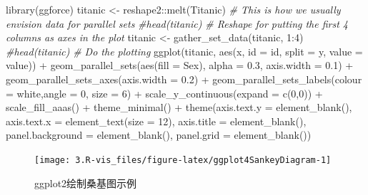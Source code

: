 \documentclass[
  10pt,
]{book}
\newenvironment{Shaded}{\begin{snugshade}}{\end{snugshade}}
\newcommand{\AttributeTok}[1]{\textcolor[rgb]{0.77,0.63,0.00}{#1}}
\newcommand{\CommentTok}[1]{\textcolor[rgb]{0.56,0.35,0.01}{\textit{#1}}}
\newcommand{\DecValTok}[1]{\textcolor[rgb]{0.00,0.00,0.81}{#1}}
\newcommand{\FloatTok}[1]{\textcolor[rgb]{0.00,0.00,0.81}{#1}}
\newcommand{\FunctionTok}[1]{\textcolor[rgb]{0.00,0.00,0.00}{#1}}
\newcommand{\NormalTok}[1]{#1}
\newcommand{\OtherTok}[1]{\textcolor[rgb]{0.56,0.35,0.01}{#1}}
\newcommand{\SpecialCharTok}[1]{\textcolor[rgb]{0.00,0.00,0.00}{#1}}
\newcommand{\StringTok}[1]{\textcolor[rgb]{0.31,0.60,0.02}{#1}}
\begin{document}
\begin{Shaded}
\begin{Highlighting}[]
\FunctionTok{library}\NormalTok{(ggforce)}
\NormalTok{titanic }\OtherTok{\textless{}{-}}\NormalTok{ reshape2}\SpecialCharTok{::}\FunctionTok{melt}\NormalTok{(Titanic)}
\CommentTok{\# This is how we usually envision data for parallel sets}
\CommentTok{\#head(titanic)}
\CommentTok{\# Reshape for putting the first 4 columns as axes in the plot}
\NormalTok{titanic }\OtherTok{\textless{}{-}} \FunctionTok{gather\_set\_data}\NormalTok{(titanic, }\DecValTok{1}\SpecialCharTok{:}\DecValTok{4}\NormalTok{)}
\CommentTok{\#head(titanic)}
\CommentTok{\# Do the plotting}
\FunctionTok{ggplot}\NormalTok{(titanic, }\FunctionTok{aes}\NormalTok{(x, }\AttributeTok{id =}\NormalTok{ id, }\AttributeTok{split =}\NormalTok{ y, }\AttributeTok{value =}\NormalTok{ value)) }\SpecialCharTok{+}
  \FunctionTok{geom\_parallel\_sets}\NormalTok{(}\FunctionTok{aes}\NormalTok{(}\AttributeTok{fill =}\NormalTok{ Sex), }\AttributeTok{alpha =} \FloatTok{0.3}\NormalTok{, }\AttributeTok{axis.width =} \FloatTok{0.1}\NormalTok{) }\SpecialCharTok{+}
  \FunctionTok{geom\_parallel\_sets\_axes}\NormalTok{(}\AttributeTok{axis.width =} \FloatTok{0.2}\NormalTok{) }\SpecialCharTok{+}
  \FunctionTok{geom\_parallel\_sets\_labels}\NormalTok{(}\AttributeTok{colour =} \StringTok{\textquotesingle{}white\textquotesingle{}}\NormalTok{,}\AttributeTok{angle =} \DecValTok{0}\NormalTok{, }\AttributeTok{size =} \DecValTok{6}\NormalTok{) }\SpecialCharTok{+}
  \FunctionTok{scale\_y\_continuous}\NormalTok{(}\AttributeTok{expand =} \FunctionTok{c}\NormalTok{(}\DecValTok{0}\NormalTok{,}\DecValTok{0}\NormalTok{)) }\SpecialCharTok{+}
  \FunctionTok{scale\_fill\_aaas}\NormalTok{() }\SpecialCharTok{+}
  \FunctionTok{theme\_minimal}\NormalTok{() }\SpecialCharTok{+}
  \FunctionTok{theme}\NormalTok{(}\AttributeTok{axis.text.y =} \FunctionTok{element\_blank}\NormalTok{(),}
        \AttributeTok{axis.text.x =} \FunctionTok{element\_text}\NormalTok{(}\AttributeTok{size =} \DecValTok{12}\NormalTok{),}
        \AttributeTok{axis.title =} \FunctionTok{element\_blank}\NormalTok{(),}
        \AttributeTok{panel.background =} \FunctionTok{element\_blank}\NormalTok{(),}
        \AttributeTok{panel.grid =} \FunctionTok{element\_blank}\NormalTok{())}
\end{Highlighting}
\end{Shaded}

\begin{figure}

{\centering \texttt{[image: 3.R-vis\_files/figure-latex/ggplot4SankeyDiagram-1]} 

}

\caption{ggplot2绘制桑基图示例}\label{fig:ggplot4SankeyDiagram}
\end{figure}
\end{document}
